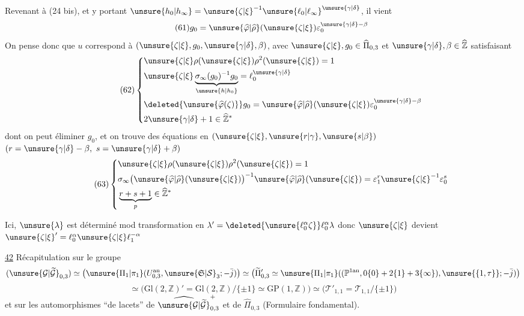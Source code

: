 Revenant à (24 bis), et y portant
$\unsure{h_0|h_\infty}=\unsure{\zeta|\xi}^{-1}\unsure{\ell_0|\ell_\infty}^{\unsure{\gamma|\delta}}$, il vient
\[
\tag{61}
g_0=\unsure{\widehat{\varphi}|\widehat{\rho}}(\unsure{\zeta|\xi})
\varepsilon_0^{\unsure{\gamma|\delta}-\beta}
\]
On pense donc que $u$ correspond à
$(\unsure{\zeta|\xi},g_0,\unsure{\gamma|\delta},\beta)$,
avec $\unsure{\zeta|\xi},g_0\in\widehat{\Pi}_{0,3}$
et $\unsure{\gamma|\delta},\beta\in\widehat{\mathbb Z}$
satisfaisant
\[
\tag{62}
\left\{
\begin{aligned}
&\unsure{\zeta|\xi}\rho(\unsure{\zeta|\xi})\rho^2(\unsure{\zeta|\xi})=1\\
&\unsure{\zeta|\xi}\underbrace{\sigma_\infty(g_0)^{-1}g_0}_{\unsure{h|h_0}}
=\ell_0^{\unsure{\gamma|\delta}}\\
&\deleted{\unsure{\widehat{\varphi}(\zeta)}}g_0
=\unsure{\widehat{\varphi}|\widehat{\rho}}(\unsure{\zeta|\xi})
\varepsilon_0^{\unsure{\gamma|\delta}-\beta}\\
&2\unsure{\gamma|\delta}+1\in\widehat{\mathbb Z}^{*}
\end{aligned}
\right.
\]
dont on peut éliminer $g_0$, et on trouve des équations en
$(\unsure{\zeta|\xi},\unsure{r|\gamma},\unsure{s|\beta})$
$(r=\unsure{\gamma|\delta}-\beta,\ s=\unsure{\gamma|\delta}+\beta)$
\[
\tag{63}
\left\{
\begin{aligned}
&\unsure{\zeta|\xi}\rho(\unsure{\zeta|\xi})\rho^2(\unsure{\zeta|\xi})=1\\
&\sigma_\infty\bigl(\unsure{\widehat{\varphi}|\widehat{\rho}}(\unsure{\zeta|\xi})\bigr)^{-1}
\unsure{\widehat{\varphi}|\widehat{\rho}}(\unsure{\zeta|\xi})
=\varepsilon_1^r\unsure{\zeta|\xi}^{-1}\varepsilon_0^s\\
&\underbrace{r+s+1}_{p}\in\widehat{\mathbb Z}^{*}
\end{aligned}
\right.
\]

Ici, $\unsure{\lambda}$ est déterminé mod transformation en
$\lambda'=\deleted{\unsure{\ell_0^{\alpha}\zeta}}\ell_0^\alpha\lambda$
donc $\unsure{\zeta|\xi}$ devient
$\unsure{\zeta|\xi}'=\ell_0^\alpha\unsure{\zeta|\xi}\ell_1^{-\alpha}$



\uline{42} Récapitulation sur le groupe
\[
(\unsure{\mathcal G|\widetilde{\mathcal G}}_{0,3})
\simeq
\bigl(\unsure{\Pi_1|\pi_1}(U_{0,3}^{\mathrm{an}},\unsure{\mathfrak S|\mathcal S}_3;-\bar j)\bigr)
\simeq
\bigl(\widetilde\Pi'_{0,3}\simeq
\unsure{\Pi_1|\pi_1}((\mathbb P^{1\mathrm{an}},0\{0\}+2\{1\}+3\{\infty\}),\unsure{\{1,\tau\}};-\bar j)\bigr)
\]
\[
\simeq\bigl(\mathrm{Gl}(2,\mathbb Z)'=\mathrm{Gl}(2,\mathbb Z)/\{\pm1\}
\simeq\mathrm{GP}(1,\mathbb Z)\bigr)
\simeq\bigl(\mathcal T'_{1,1}=\mathcal T_{1,1}/\{\pm1\}\bigr)
\]
et sur les automorphismes ``de lacets'' de
$\widehat{\unsure{\mathcal G|\widetilde{\mathcal G}}}_{0,3}^{+}$ et de
$\widehat\Pi_{0,3}$ (Formulaire fondamental).

